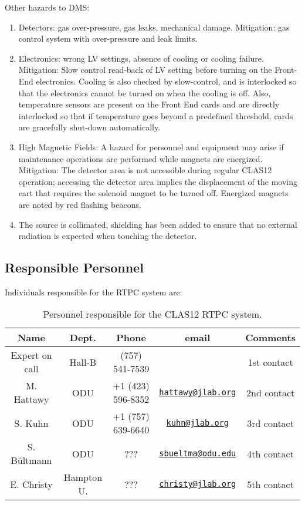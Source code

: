 Other hazards to DMS:
\begin{enumerate}
\item Detectors: gas over-pressure, gas leaks, mechanical damage. Mitigation: 
gas control system with over-pressure and leak limits.  
\item Electronics: wrong LV settings, absence of cooling or cooling failure.  
   Mitigation: Slow control read-back of LV setting before turning on the 
      Front-End electronics. Cooling is also checked by slow-control, and is 
      interlocked so that the electronics cannot be turned on when the cooling 
      is off. Also, temperature sensors are present on the Front End cards and 
      are directly interlocked so that if temperature goes beyond a predefined 
      threshold, cards are gracefully shut-down automatically.
\item High Magnetic Fields: A hazard for personnel and equipment may arise if 
   maintenance operations are performed while magnets are energized.  
      Mitigation: The detector area is not accessible during regular CLAS12 
      operation; accessing the detector area implies the displacement of the 
      moving cart that requires the solenoid magnet to be turned off. Energized 
      magnets are noted by red flashing beacons.
\item The source is collimated, shielding has been added to ensure that no 
   external radiation is expected when touching the detector.
\end{enumerate}

\subsection{Responsible Personnel}

Individuals responsible for the RTPC system are:

\begin{table}[!htb]
\centering
\begin{tabular}{|c|c|c|c|c|} \hline
Name&Dept.&Phone&email&Comments \\ \hline
Expert on call&Hall-B &(757) 541-7539&& 1st contact \\ \hline
M. Hattawy &ODU&+1 (423) 596-8352&\href{mailto:hattawy@jlab.org}{\nolinkurl{hattawy@jlab.org}}&2nd contact \\ \hline
S. Kuhn&ODU&+1 (757) 639-6640&\href{mailto:kuhn@jlab.org}{\nolinkurl{kuhn@jlab.org}}&3rd contact \\ \hline
S. B\"ultmann&ODU&???&\href{mailto:sbueltma@odu.edu}{\nolinkurl{sbueltma@odu.edu}}&4th contact \\ \hline
E. Christy&Hampton U.&???&\href{mailto:christy@jlab.org}{\nolinkurl{christy@jlab.org}}&5th contact \\ \hline
\end{tabular}
\caption{Personnel responsible for the CLAS12 RTPC system.} 
\label{tb:rtpc}
\end{table}


